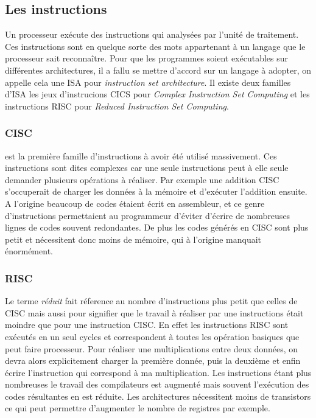 \subsection{Les instructions}
Un processeur exécute des instructions qui analysées par l'unité de traitement. Ces instructions sont en quelque sorte des mots appartenant à un langage que le processeur sait reconnaître. Pour que les programmes soient exécutables sur différentes architectures, il a fallu se mettre d'accord sur un langage à adopter, on appelle cela une ISA pour \textit{instruction set architecture}. Il existe deux familles d'ISA les jeux d'instrucions CICS pour \textit{Complex Instruction Set Computing} et les instructions RISC pour \textit{Reduced Instruction Set Computing}.

\subsubsection{CISC}  est la première famille d'instructions à avoir été utilisé massivement. Ces instructions sont dites complexes car une seule instructions peut à elle seule demander plusieurs opérations à réaliser. Par exemple une addition CISC s'occuperait de charger les données à la mémoire et d'exécuter l'addition ensuite. A l'origine beaucoup de codes étaient écrit en assembleur, et ce genre d'instructions permettaient au programmeur d'éviter d'écrire de nombreuses lignes de codes souvent redondantes. De plus les codes générés en CISC sont plus petit et nécessitent donc moins de mémoire, qui à l'origine manquait énormément.

\subsubsection{RISC} Le terme \textit{réduit} fait réference au nombre d'instructions plus petit que celles de CISC mais aussi pour signifier que le travail à réaliser par une instructions était moindre que pour une instruction CISC. En effet les instructions RISC sont exécutés en un seul cycles et correspondent à toutes les opération basiques que peut faire processeur. Pour réaliser une multiplications entre deux données, on devra alors explicitement charger la première donnée, puis la deuxième et enfin écrire l'instruction qui correspond à ma multiplication. Les instructions étant plus nombreuses le travail des compilateurs est augmenté mais souvent l'exécution des codes résultantes en est réduite. Les architectures nécessitent moins de transistors ce qui peut permettre d'augmenter le nombre de registres par exemple.

